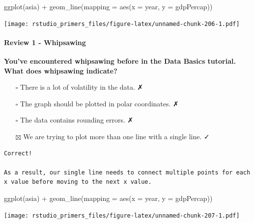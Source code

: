 \documentclass[
]{article}
\newenvironment{Shaded}{\begin{snugshade}}{\end{snugshade}}
\newcommand{\AttributeTok}[1]{\textcolor[rgb]{0.77,0.63,0.00}{#1}}
\newcommand{\FunctionTok}[1]{\textcolor[rgb]{0.00,0.00,0.00}{#1}}
\newcommand{\NormalTok}[1]{#1}
\newcommand{\SpecialCharTok}[1]{\textcolor[rgb]{0.00,0.00,0.00}{#1}}
\providecommand{\tightlist}{%
  \setlength{\itemsep}{0pt}\setlength{\parskip}{0pt}}
\begin{document}
\begin{Shaded}
\begin{Highlighting}[]
\FunctionTok{ggplot}\NormalTok{(asia) }\SpecialCharTok{+}
  \FunctionTok{geom\_line}\NormalTok{(}\AttributeTok{mapping =} \FunctionTok{aes}\NormalTok{(}\AttributeTok{x =}\NormalTok{ year, }\AttributeTok{y =}\NormalTok{ gdpPercap))}
\end{Highlighting}
\end{Shaded}

\texttt{[image: rstudio\_primers\_files/figure-latex/unnamed-chunk-206-1.pdf]}

\hypertarget{review-1---whipsawing}{%
\paragraph{Review 1 - Whipsawing}\label{review-1---whipsawing}}

\textbf{You've encountered whipsawing before in the Data Basics
tutorial. What does whipsawing indicate?}

\begin{itemize}
\tightlist
\item[$\square$]
  There is a lot of volatility in the data. ✗
\item[$\square$]
  The graph should be plotted in polar coordinates. ✗
\item[$\square$]
  The data contains rounding errors. ✗
\item[$\boxtimes$]
  We are trying to plot more than one line with a single line. ✓
\end{itemize}

\begin{verbatim}
Correct!

As a result, our single line needs to connect multiple points for each x value before moving to the next x value.
\end{verbatim}

\begin{Shaded}
\begin{Highlighting}[]
\FunctionTok{ggplot}\NormalTok{(asia) }\SpecialCharTok{+}
  \FunctionTok{geom\_line}\NormalTok{(}\AttributeTok{mapping =} \FunctionTok{aes}\NormalTok{(}\AttributeTok{x =}\NormalTok{ year, }\AttributeTok{y =}\NormalTok{ gdpPercap))}
\end{Highlighting}
\end{Shaded}

\texttt{[image: rstudio\_primers\_files/figure-latex/unnamed-chunk-207-1.pdf]}
\end{document}
